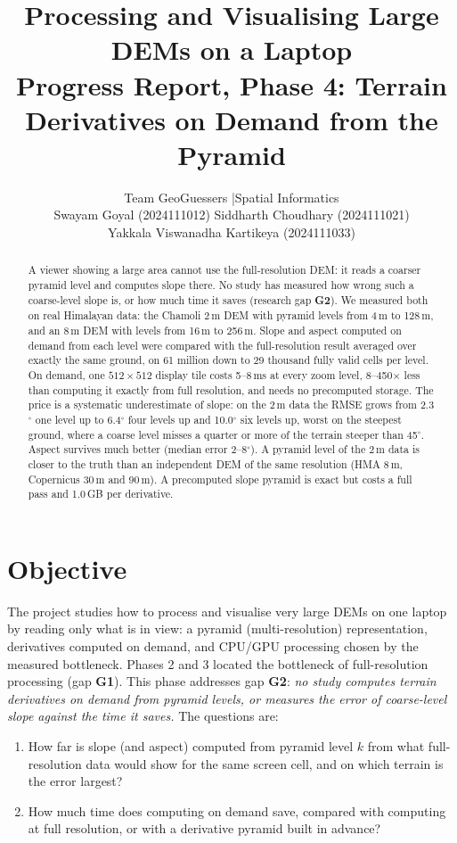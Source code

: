 ﻿\documentclass[11pt,a4paper]{article}
\title{\textbf{Processing and Visualising Large DEMs on a Laptop}\\[4pt]
\large Progress Report, Phase 4: Terrain Derivatives on Demand from the Pyramid}
\author{Team GeoGuessers \quad|\quad Spatial Informatics\\[4pt]
Swayam Goyal (2024111012) \quad Siddharth Choudhary (2024111021)\\
Yakkala Viswanadha Kartikeya (2024111033)}
\date{}
\begin{document}
\maketitle

\begin{abstract}
\noindent
A viewer showing a large area cannot use the full-resolution DEM: it reads a coarser pyramid level and computes
slope there. No study has measured how wrong such a coarse-level slope is, or how much time it saves (research gap
\textbf{G2}). We measured both on real Himalayan data: the Chamoli 2\,m DEM with pyramid levels from 4\,m to 128\,m,
and an 8\,m DEM with levels from 16\,m to 256\,m. Slope and aspect computed on demand from each level were compared
with the full-resolution result averaged over exactly the same ground, on 61 million down to 29 thousand fully
valid cells per level. On demand, one $512\times512$ display tile costs 5--8\,ms at every zoom level, 8--450$\times$
less than computing it exactly from full resolution, and needs no precomputed storage. The price is a systematic
underestimate of slope: on the 2\,m data the RMSE grows from 2.3$^\circ$ one level up to 6.4$^\circ$ four levels up
and 10.0$^\circ$ six levels up, worst on the steepest ground, where a coarse level misses a quarter or more of the
terrain steeper than 45$^\circ$. Aspect survives much better (median error 2--8$^\circ$). A pyramid level of the
2\,m data is closer to the truth than an independent DEM of the same resolution (HMA 8\,m, Copernicus 30\,m and
90\,m). A precomputed slope pyramid is exact but costs a full pass and 1.0\,GB per derivative.
\end{abstract}

\section{Objective}
The project studies how to process and visualise very large DEMs on one laptop by reading only what is in view:
a pyramid (multi-resolution) representation, derivatives computed on demand, and CPU/GPU processing chosen by the
measured bottleneck. Phases 2 and 3 located the bottleneck of full-resolution processing (gap \textbf{G1}). This
phase addresses gap \textbf{G2}: \emph{no study computes terrain derivatives on demand from pyramid levels, or
measures the error of coarse-level slope against the time it saves.} The questions are:
\begin{enumerate}
  \item How far is slope (and aspect) computed from pyramid level $k$ from what full-resolution data would show for
  the same screen cell, and on which terrain is the error largest?
  \item How much time does computing on demand save, compared with computing at full resolution, or with a
  derivative pyramid built in advance?
\end{enumerate}
\end{document}
